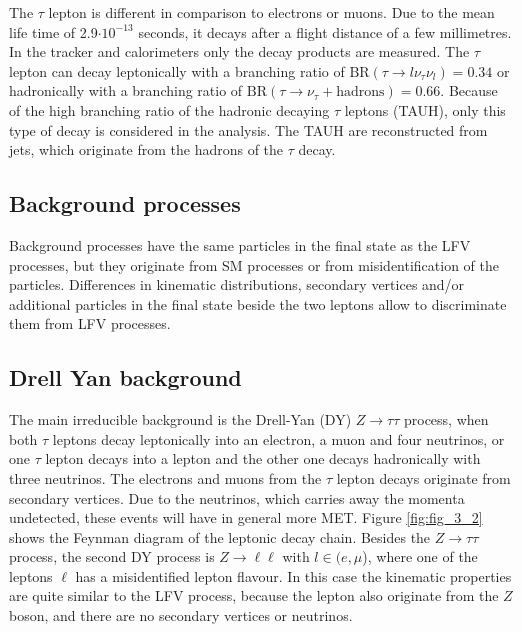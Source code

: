The $\tau$ lepton \cite{TAU} is different in comparison to electrons or muons. Due to the mean life time of 2.9$\cdot 10^{-13}$ seconds, it decays after a flight distance of a few millimetres. In the tracker and calorimeters only the decay products are measured. The $\tau$ lepton can decay leptonically with a branching ratio of $\text{BR}(\tau \to l\nu_{\tau}\nu_{l}) = 0.34$ or hadronically with a branching ratio of $\text{BR}(\tau \to \nu_{\tau} + \text{hadrons}) = 0.66$. Because of the high branching ratio of the hadronic decaying $\tau$ leptons (\gls{TAUH}), only this type of decay is considered in the analysis. The \gls{TAUH} are reconstructed from jets, which originate from the hadrons of the $\tau$ decay. 

\subsection{Background processes}
\label{sec:section_3_1_2}

Background processes have the same particles in the final state as the \gls{LFV} processes, but they originate from \gls{SM} processes or from misidentification of the particles. Differences in kinematic distributions, secondary vertices and/or additional particles in the final state beside the two leptons allow to discriminate them from \gls{LFV} processes. \\

\subsection*{Drell Yan background}

The main irreducible background is the Drell-Yan (\gls{DY}) $Z\to\tau\tau$ process, when both $\tau$ leptons decay leptonically into an electron, a muon and four neutrinos, or one $\tau$ lepton decays into a lepton and the other one decays hadronically with three neutrinos. The electrons and muons from the $\tau$ lepton decays originate from secondary vertices. Due to the neutrinos, which carries away the momenta undetected, these events will have in general more \gls{MET}. Figure \ref{fig:fig_3_2} shows the Feynman diagram of the leptonic decay chain. Besides the $Z\to\tau\tau$ process, the second \gls{DY} process is $Z\to\ell\ell$ with $l \in (e, \mu$), where one of the leptons $\ell$ has a misidentified lepton flavour. In this case the kinematic properties are quite similar to the \gls{LFV} process, because the lepton also originate from the $Z$ boson, and there are no secondary vertices or neutrinos. \\


